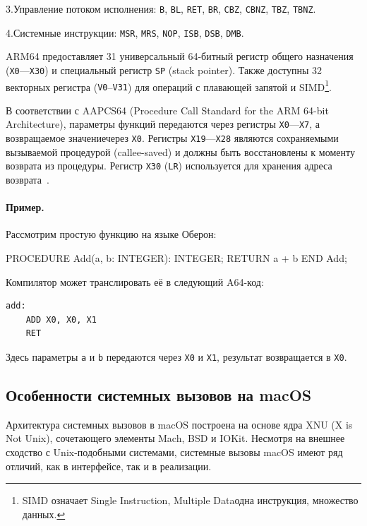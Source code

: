 \documentclass[utf8]{lgu}
\newcommand{\tire}{\unskip\nobreak\thinspace\textemdash\thinspace}
\newcommand{\code}[1]{{\normalsize\texttt{#1}}}
\begin{document}
3.\hspace{0.5em}Управление потоком исполнения: \code{B}, \code{BL}, \code{RET}, \code{BR}, \code{CBZ}, \code{CBNZ}, \code{TBZ}, \code{TBNZ}.

4.\hspace{0.5em}Системные инструкции: \code{MSR}, \code{MRS}, \code{NOP}, \code{ISB}, \code{DSB}, \code{DMB}.

ARM64 предоставляет 31 универсальный 64-битный регистр общего назначения (\code{X0}---\code{X30}) и специальный регистр \code{SP} (stack pointer). Также доступны 32 векторных регистра (\code{V0}–\code{V31}) для операций с плавающей запятой и SIMD\footnote{SIMD означает Single Instruction, Multiple Data\tire одна инструкция, множество данных.}.

В соответствии с AAPCS64 (Procedure Call Standard for the ARM 64-bit Architecture), параметры функций передаются через регистры \code{X0}---\code{X7}, а возвращаемое значение\tire через \code{X0}. Регистры \code{X19}---\code{X28} являются сохраняемыми вызываемой процедурой (callee-saved) и должны быть восстановлены к моменту возврата из процедуры. Регистр \code{X30} (\code{LR}) используется для хранения адреса возврата~\cite{AAPCS64}.

\paragraph{Пример.} Рассмотрим простую функцию на языке Оберон:

\begin{modula2}
PROCEDURE Add(a, b: INTEGER): INTEGER;
RETURN a + b END Add;
\end{modula2}

Компилятор может транслировать её в следующий A64-код:

{\samepage
{\small\begin{verbatim}
add:
    ADD X0, X0, X1
    RET
\end{verbatim}}

Здесь параметры \code{a} и \code{b} передаются через \code{X0} и \code{X1}, результат возвращается в \code{X0}.
}

\subsection{Особенности системных вызовов на macOS}

\firstparskip Архитектура системных вызовов в macOS построена на основе ядра XNU (X is Not Unix), сочетающего элементы Mach, BSD и IOKit. Несмотря на внешнее сходство с Unix-подобными системами, системные вызовы macOS имеют ряд отличий, как в интерфейсе, так и в реализации.
\end{document}
